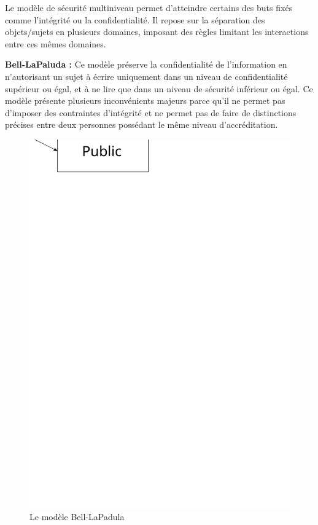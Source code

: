 \documentclass[pdftex,a4paper,titlepage,11pt]{article}
\begin{document}
Le modèle de sécurité multiniveau permet d'atteindre certains des buts fixés comme l'intégrité ou la confidentialité. Il repose sur la séparation des objets/sujets en plusieurs domaines, imposant des règles limitant les interactions entre ces mêmes domaines.

\textbf{Bell-LaPaluda :} Ce modèle préserve la confidentialité de l'information en n'autorisant un sujet à écrire uniquement dans un niveau de confidentialité supérieur ou égal, et à ne lire que dans un niveau de sécurité inférieur ou égal. Ce modèle présente plusieurs inconvénients majeurs parce qu'il ne permet pas d'imposer des contraintes d'intégrité et ne permet pas de faire de distinctions précises entre deux personnes possédant le même niveau d'accréditation.

\begin{figure}[h]
	\centering
	\includegraphics[scale=0.5]{bell-lp}
	\caption{Le modèle Bell-LaPadula}
\end{figure}
\end{document}
